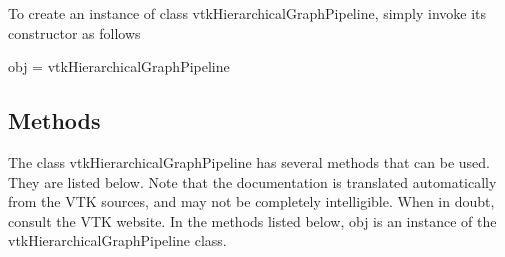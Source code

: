 To create an instance of class vtk\-Hierarchical\-Graph\-Pipeline, simply invoke its constructor as follows \begin{DoxyVerb}  obj = vtkHierarchicalGraphPipeline
\end{DoxyVerb}
 \hypertarget{vtkwidgets_vtkxyplotwidget_Methods}{}\subsection{Methods}\label{vtkwidgets_vtkxyplotwidget_Methods}
The class vtk\-Hierarchical\-Graph\-Pipeline has several methods that can be used. They are listed below. Note that the documentation is translated automatically from the V\-T\-K sources, and may not be completely intelligible. When in doubt, consult the V\-T\-K website. In the methods listed below, {\ttfamily obj} is an instance of the vtk\-Hierarchical\-Graph\-Pipeline class. 
